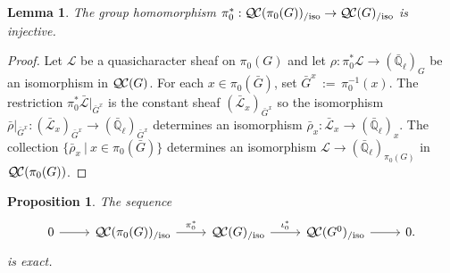 \documentclass[CM,Submssn,SecEq]{degruyter-crelle} %
\theoremstyle{plain}
\newtheorem{proposition}[theorem]{Proposition}
\newtheorem{lemma}[theorem]{Lemma}
\theoremstyle{definition}
\theoremstyle{remark}
\newcommand{\EE}{\mathbb{\bar Q}_\ell}
\newcommand{\ceq}{{\, :=\, }}
\newcommand{\tq}{{\ \vert\ }}
\newcommand{\qcs}[1]{{\mathcal{#1}}}
\newcommand{\gqcs}[1]{{\mathcal{\bar #1}}}
\newcommand{\QC}{{\mathcal{Q\hskip-0.8pt C}}}
\newcommand{\QCiso}[1]{\QC(#1)_{/\text{iso}}}
\newcommand{\bG}{\bar{G}}
\newcommand{\brho}{{\bar\rho}}
\begin{document}
\begin{lemma}\label{lem:extension}
The group homomorphism $\pi_0^*: \QCiso{\pi_0(G)} \to \QCiso{G}$ is injective.
\end{lemma}
\begin{proof}
Let $\qcs{L}$ be a quasicharacter sheaf on $\pi_0(G)$ and let $\rho : \pi_0^*\qcs{L} \to (\EE)_{G}$ be an isomorphism in $\QC(G)$. 
For each $x\in \pi_0(\bG)$, set $\bG^x \ceq \pi_0^{-1}(x)$.
The restriction $\pi_0^*\gqcs{L}\vert_{\bG^x}$ is the constant sheaf $(\gqcs{L}_x)_{\bG^x}$ so the isomorphism $\brho\vert_{\bG^x} : (\gqcs{L}_x)_{\bG^x} \to (\EE)_{\bG^x}$ determines an isomorphism $\brho_x : \gqcs{L}_x \to (\EE)_x$. The collection $\{ \brho_x \tq x\in \pi_0(\bG) \}$ determines an isomorphism $\qcs{L} \to (\EE)_{\pi_0(G)}$  in $\QC(\pi_0(G))$.
\end{proof}


\begin{proposition}\label{prop:middleexact}
 The sequence
 \[
  \begin{tikzcd}
  0 \rar & \QCiso{\pi_0(G)} \arrow{r}{\pi_0^*} & \QCiso{G} \arrow{r}{\iota_0^*} & \QCiso{G^0} \rar & 0.
  \end{tikzcd}
 \]
 is exact.
\end{proposition}
\end{document}
